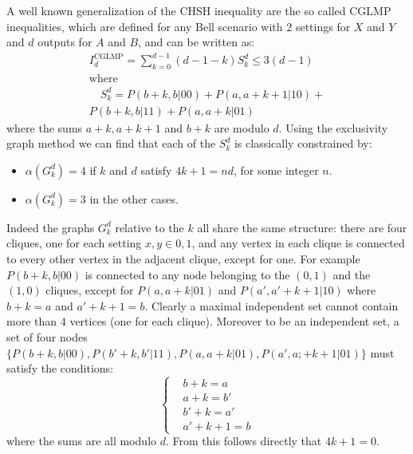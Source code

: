 \documentclass[letterpaper]{article}
\begin{document}
A well known generalization of the CHSH inequality are the so called CGLMP
\cite{cglmp} inequalities, which are defined for any Bell scenario with 2
settings for $X$ and $Y$ and $d$ outputs for $A$ and $B$, and can be written as:
\begin{gather}
    I_d^{\mathrm{CGLMP}} = \sum_{k=0}^{d-1} (d-1-k) S^d_k \le 3 (d-1)\\ \nonumber
    \text{where}\\
    \quad S^d_k = P(b+k,b|00) + P(a, a+k+1|10) +\\ \nonumber
    P(b+k, b | 11) +
    P(a, a+k | 01)
    \label{eq:GCLMP}
\end{gather}
where the sums $a+k, a+k+1$ and $b+k$ are modulo $d$.
Using the exclusivity graph method we can find that each of the $S^d_k$ is
classically constrained by:
\begin{itemize}
    \item $\alpha(G^d_k) = 4$ if $k$ and $d$ satisfy $4k+1=n d$, for some
        integer $n$.
    \item $\alpha(G^d_k) = 3$ in the other cases.
\end{itemize}
Indeed the graphs $G^d_k$ relative to the $k$ all share the same structure:
there are four cliques, one for each setting $x,y \in {0,1}$, and any vertex in each clique is
connected to every other vertex in the adjacent clique, except for one.
For example $P(b+k,b|00)$ is connected to any node belonging to the $(0,1)$ and the
$(1,0)$ cliques, except for $P(a,a+k|01)$ and $P(a',a'+k+1|10)$ where $b+k = a$ and
$a'+k+1 = b$.
Clearly a maximal independent set cannot contain more than $4$ vertices (one for
each clique).
Moreover to be an independent set, a set of four nodes $\{P(b+k,b|00),
P(b'+k,b'|11), P(a,a+k|01), P(a',a;+k+1|01)\}$ must satisfy the conditions:
\begin{equation}
    \left\{
        \begin{aligned}
            &b + k = a \\
            &a + k = b' \\
            &b' + k = a' \\
            &a' + k + 1 = b 
        \end{aligned}
    \right.
    \label{eq:four_indipset_condition}
\end{equation}
where the sums are all modulo $d$.
From this follows directly that $4k+1 = 0$. 
\end{document}
